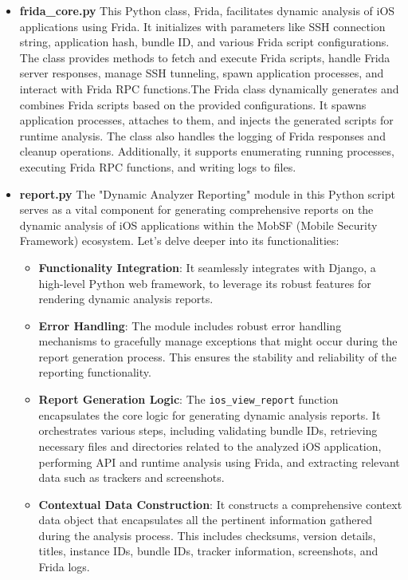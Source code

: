 \documentclass{report}
\begin{document}
\begin{itemize}
\begin{itemize}
        \item \textbf {frida\_core.py}
        This Python class, Frida, facilitates dynamic analysis of iOS applications using Frida. It initializes with parameters like SSH connection string, application hash, bundle ID, and various Frida script configurations. The class provides methods to fetch and execute Frida scripts, handle Frida server responses, manage SSH tunneling, spawn application processes, and interact with Frida RPC functions.The Frida class dynamically generates and combines Frida scripts based on the provided configurations. It spawns application processes, attaches to them, and injects the generated scripts for runtime analysis. The class also handles the logging of Frida responses and cleanup operations. Additionally, it supports enumerating running processes, executing Frida RPC functions, and writing logs to files.

        \item \textbf {report.py}
        The "Dynamic Analyzer Reporting" module in this Python script serves as a vital component for generating comprehensive reports on the dynamic analysis of iOS applications within the MobSF (Mobile Security Framework) ecosystem. Let's delve deeper into its functionalities:

        \begin{itemize}
            \item \textbf{Functionality Integration}: It seamlessly integrates with Django, a high-level Python web framework, to leverage its robust features for rendering dynamic analysis reports.
            
            \item \textbf{Error Handling}: The module includes robust error handling mechanisms to gracefully manage exceptions that might occur during the report generation process. This ensures the stability and reliability of the reporting functionality.
            
            \item \textbf{Report Generation Logic}: The \texttt{ios\_view\_report} function encapsulates the core logic for generating dynamic analysis reports. It orchestrates various steps, including validating bundle IDs, retrieving necessary files and directories related to the analyzed iOS application, performing API and runtime analysis using Frida, and extracting relevant data such as trackers and screenshots.
            
            \item \textbf{Contextual Data Construction}: It constructs a comprehensive context data object that encapsulates all the pertinent information gathered during the analysis process. This includes checksums, version details, titles, instance IDs, bundle IDs, tracker information, screenshots, and Frida logs.
            

\end{itemize}
\end{itemize}
\end{itemize}
\end{document}
